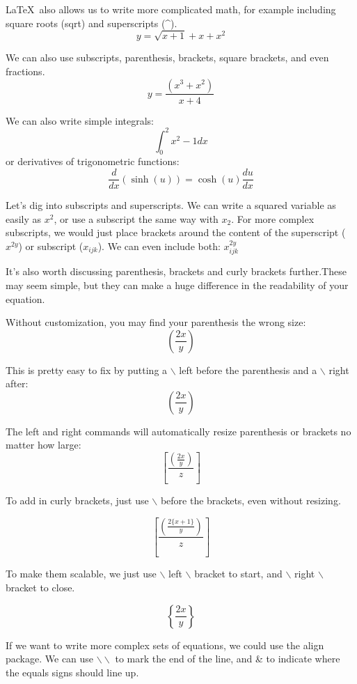 \documentclass{article}
\begin{document}
\LaTeX\ also allows us to write more complicated math, for example including square roots (sqrt) and superscripts (\^{}).
\[
y = \sqrt{x + 1} + x + x^2
\]

We can also use subscripts, parenthesis, brackets, square brackets, and even fractions.
\[
y = \frac{(x^3+x^2)}{x+4}
\]

We can also write simple integrals:
\[
\int_0^2x^2 - 1 dx
\]
or derivatives of trigonometric functions:
\[
\frac{d}{dx}(\sinh(u))=\cosh(u)\frac{du}{dx}
\]

Let's dig into subscripts and superscripts. We can write a squared variable as easily as $x^2$, or use a subscript the same way with $x_2$. For more complex subscripts, we would just place brackets around the content of the superscript ($x^{2y}$) or subscript ($x_{ijk}$). We can even include both: $x^{2y}_{ijk}$

It's also worth discussing parenthesis, brackets and curly brackets further.These may seem simple, but they can make a huge difference in the readability of your equation.

Without customization, you may find your parenthesis the wrong size:
\[
(\frac{2x} %
{y}) %
\]

This is pretty easy to fix by putting a $\backslash$ left before the parenthesis and a $\backslash$ right after:
\[
\left(\frac{2x}{y}\right)
\]

The left and right commands will automatically resize parenthesis or brackets no matter how large:
\[
\left[\frac{\left(\frac{2x}{y}\right)}{z}\right]
\]


To add in curly brackets, just use $\backslash$ before the brackets, even without resizing.

\[
\left[\frac{\left(\frac{2\{x+1\}}{y}\right)}{z}\right]
\]

To make them scalable, we just use $\backslash$ left $\backslash$ bracket to start, and $\backslash$ right $\backslash$ bracket to close.

\[
\left\{\frac{2x}{y}\right\}
\]


If we want to write more complex sets of equations, we could use the align package. We can use $\backslash\backslash$ to mark the end of the line, and \& to indicate where the equals signs should line up.
\end{document}
